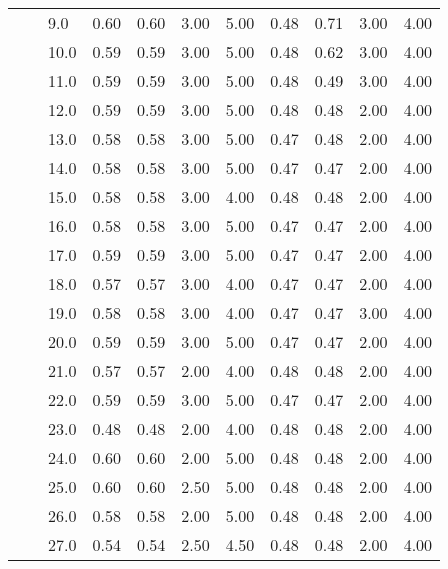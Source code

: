 \begin{tabular}{lllrrrrrrrr}
      &     & 9.0  &       0.60 &      0.60 & 3.00 &   5.00 &       0.48 &      0.71 & 3.00 &   4.00 \\
      &     & 10.0 &       0.59 &      0.59 & 3.00 &   5.00 &       0.48 &      0.62 & 3.00 &   4.00 \\
      &     & 11.0 &       0.59 &      0.59 & 3.00 &   5.00 &       0.48 &      0.49 & 3.00 &   4.00 \\
      &     & 12.0 &       0.59 &      0.59 & 3.00 &   5.00 &       0.48 &      0.48 & 2.00 &   4.00 \\
      &     & 13.0 &       0.58 &      0.58 & 3.00 &   5.00 &       0.47 &      0.48 & 2.00 &   4.00 \\
      &     & 14.0 &       0.58 &      0.58 & 3.00 &   5.00 &       0.47 &      0.47 & 2.00 &   4.00 \\
      &     & 15.0 &       0.58 &      0.58 & 3.00 &   4.00 &       0.48 &      0.48 & 2.00 &   4.00 \\
      &     & 16.0 &       0.58 &      0.58 & 3.00 &   5.00 &       0.47 &      0.47 & 2.00 &   4.00 \\
      &     & 17.0 &       0.59 &      0.59 & 3.00 &   5.00 &       0.47 &      0.47 & 2.00 &   4.00 \\
      &     & 18.0 &       0.57 &      0.57 & 3.00 &   4.00 &       0.47 &      0.47 & 2.00 &   4.00 \\
      &     & 19.0 &       0.58 &      0.58 & 3.00 &   4.00 &       0.47 &      0.47 & 3.00 &   4.00 \\
      &     & 20.0 &       0.59 &      0.59 & 3.00 &   5.00 &       0.47 &      0.47 & 2.00 &   4.00 \\
      &     & 21.0 &       0.57 &      0.57 & 2.00 &   4.00 &       0.48 &      0.48 & 2.00 &   4.00 \\
      &     & 22.0 &       0.59 &      0.59 & 3.00 &   5.00 &       0.47 &      0.47 & 2.00 &   4.00 \\
      &     & 23.0 &       0.48 &      0.48 & 2.00 &   4.00 &       0.48 &      0.48 & 2.00 &   4.00 \\
      &     & 24.0 &       0.60 &      0.60 & 2.00 &   5.00 &       0.48 &      0.48 & 2.00 &   4.00 \\
      &     & 25.0 &       0.60 &      0.60 & 2.50 &   5.00 &       0.48 &      0.48 & 2.00 &   4.00 \\
      &     & 26.0 &       0.58 &      0.58 & 2.00 &   5.00 &       0.48 &      0.48 & 2.00 &   4.00 \\
      &     & 27.0 &       0.54 &      0.54 & 2.50 &   4.50 &       0.48 &      0.48 & 2.00 &   4.00 \\

\end{tabular}
